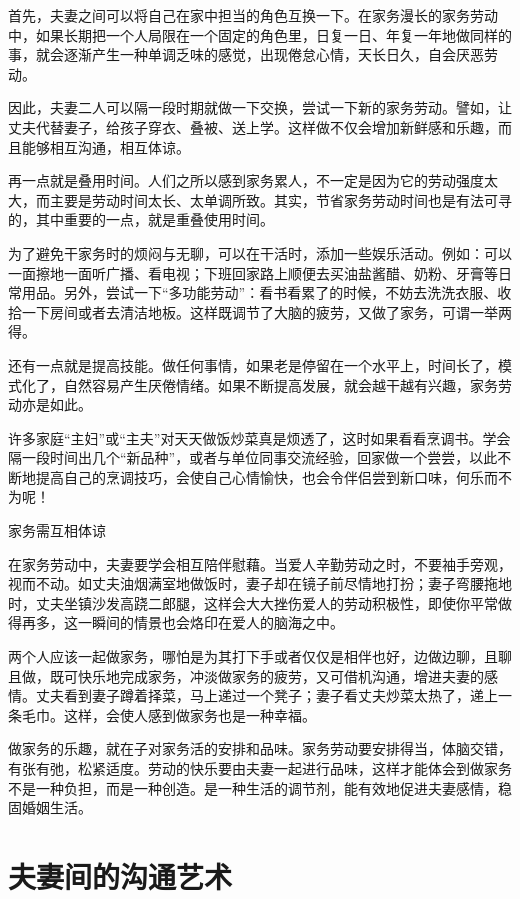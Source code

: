 \documentclass[12pt,UTF8,openany]{ctexbook}
\begin{document}
首先，夫妻之间可以将自己在家中担当的角色互换一下。在家务漫长的家务劳动中，如果长期把一个人局限在一个固定的角色里，日复一日、年复一年地做同样的事，就会逐渐产生一种单调乏味的感觉，出现倦怠心情，天长日久，自会厌恶劳动。

因此，夫妻二人可以隔一段时期就做一下交换，尝试一下新的家务劳动。譬如，让丈夫代替妻子，给孩子穿衣、叠被、送上学。这样做不仅会增加新鲜感和乐趣，而且能够相互沟通，相互体谅。

再一点就是叠用时间。人们之所以感到家务累人，不一定是因为它的劳动强度太大，而主要是劳动时间太长、太单调所致。其实，节省家务劳动时间也是有法可寻的，其中重要的一点，就是重叠使用时间。

为了避免干家务时的烦闷与无聊，可以在干活时，添加一些娱乐活动。例如：可以一面擦地一面听广播、看电视；下班回家路上顺便去买油盐酱醋、奶粉、牙膏等日常用品。另外，尝试一下“多功能劳动”：看书看累了的时候，不妨去洗洗衣服、收拾一下房间或者去清洁地板。这样既调节了大脑的疲劳，又做了家务，可谓一举两得。

还有一点就是提高技能。做任何事情，如果老是停留在一个水平上，时间长了，模式化了，自然容易产生厌倦情绪。如果不断提高发展，就会越干越有兴趣，家务劳动亦是如此。

许多家庭“主妇”或“主夫”对天天做饭炒菜真是烦透了，这时如果看看烹调书。学会隔一段时间出几个“新品种”，或者与单位同事交流经验，回家做一个尝尝，以此不断地提高自己的烹调技巧，会使自己心情愉快，也会令伴侣尝到新口味，何乐而不为呢！





家务需互相体谅


在家务劳动中，夫妻要学会相互陪伴慰藉。当爱人辛勤劳动之时，不要袖手旁观，视而不动。如丈夫油烟满室地做饭时，妻子却在镜子前尽情地打扮；妻子弯腰拖地时，丈夫坐镇沙发高跷二郎腿，这样会大大挫伤爱人的劳动积极性，即使你平常做得再多，这一瞬间的情景也会烙印在爱人的脑海之中。

两个人应该一起做家务，哪怕是为其打下手或者仅仅是相伴也好，边做边聊，且聊且做，既可快乐地完成家务，冲淡做家务的疲劳，又可借机沟通，增进夫妻的感情。丈夫看到妻子蹲着择菜，马上递过一个凳子；妻子看丈夫炒菜太热了，递上一条毛巾。这样，会使人感到做家务也是一种幸福。

做家务的乐趣，就在子对家务活的安排和品味。家务劳动要安排得当，体脑交错，有张有弛，松紧适度。劳动的快乐要由夫妻一起进行品味，这样才能体会到做家务不是一种负担，而是一种创造。是一种生活的调节剂，能有效地促进夫妻感情，稳固婚姻生活。





\chapter{夫妻间的沟通艺术}
\end{document}
